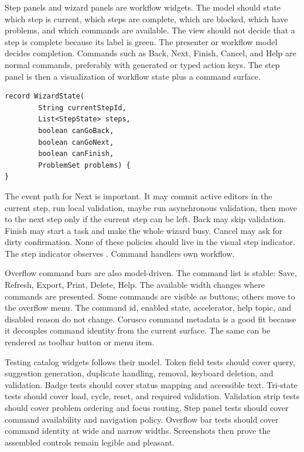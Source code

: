 Step panels and wizard panels are workflow widgets. The model should state which step is
current, which steps are complete, which are blocked, which have problems, and which
commands are available. The view should not decide that a step is complete because its
label is green. The presenter or workflow model decides completion. Commands such as
Back, Next, Finish, Cancel, and Help are normal commands, preferably with generated or
typed action keys. The step panel is then a visualization of workflow state plus a
command surface.

\begin{lstlisting}[caption={Wizard commands read workflow state, not card layout.}]
record WizardState(
        String currentStepId,
        List<StepState> steps,
        boolean canGoBack,
        boolean canGoNext,
        boolean canFinish,
        ProblemSet problems) {
}
\end{lstlisting}

The event path for Next is important. It may commit active editors in the current step,
run local validation, maybe run asynchronous validation, then move to the next step only
if the current step can be left. Back may skip validation. Finish may start a task and
make the whole wizard busy. Cancel may ask for dirty confirmation. None of these
policies should live in the visual step indicator. The step indicator observes
. Command handlers own workflow.

Overflow command bars are also model-driven. The command list is stable: Save, Refresh,
Export, Print, Delete, Help. The available width changes where commands are presented.
Some commands are visible as buttons; others move to the overflow menu. The command id,
enabled state, accelerator, help topic, and disabled reason do not change. Corusco
command metadata is a good fit because it decouples command identity from the current
surface. The same
 can be rendered as toolbar button or menu item.

Testing catalog widgets follows their model. Token field tests should cover query,
suggestion generation, duplicate handling, removal, keyboard deletion, and validation.
Badge tests should cover status mapping and accessible text. Tri-state tests should
cover load, cycle, reset, and required validation. Validation strip tests should cover
problem ordering and focus routing. Step panel tests should cover command availability
and navigation policy. Overflow bar tests should cover command identity at wide and
narrow widths. Screenshots then prove the assembled controls remain legible and
pleasant.

